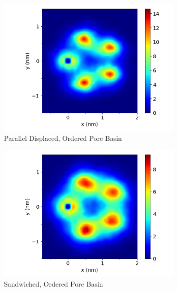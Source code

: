 \documentclass[journal=jpcbfk,manusciprt=article]{achemso}
\begin{document}
  \begin{figure}
  \centering
  \begin{subfigure}{0.47\textwidth}
        \includegraphics[width=1\linewidth]{layered_xy_correlation.png}
        \caption{Parallel Displaced, Ordered Pore Basin}
        \label{fig:layered_xy_correlation_comparison}
  \end{subfigure}
  \begin{subfigure}{0.47\textwidth}
        \includegraphics[width=1\linewidth]{layered_solvated_xy_correlation.png}
        \caption{Sandwiched, Ordered Pore Basin}
        \label{fig:layered_solvated_xy_correlation}
  \end{subfigure}
  \begin{subfigure}{0.47\textwidth}

\end{subfigure}
\end{figure}
\end{document}
